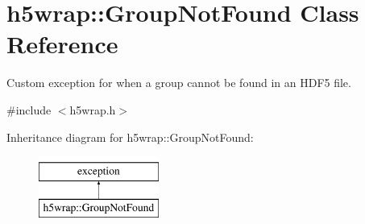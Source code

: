 \hypertarget{classh5wrap_1_1_group_not_found}{\section{h5wrap\+:\+:Group\+Not\+Found Class Reference}
\label{classh5wrap_1_1_group_not_found}
}


Custom exception for when a group cannot be found in an H\+D\+F5 file.  




{\ttfamily \#include $<$h5wrap.\+h$>$}

Inheritance diagram for h5wrap\+:\+:Group\+Not\+Found\+:\begin{figure}[H]
\begin{center}
\leavevmode
\includegraphics[height=2.000000cm]{classh5wrap_1_1_group_not_found}
\end{center}
\end{figure}
